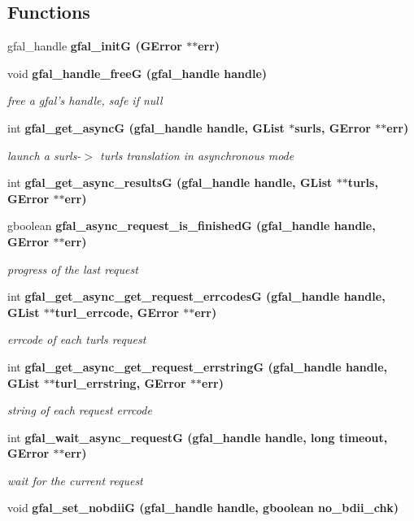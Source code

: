 \subsection*{Functions}
\begin{CompactItemize}
\item 
gfal\_\-handle \bf{gfal\_\-init\-G} (GError $\ast$$\ast$err)
\item 
void \bf{gfal\_\-handle\_\-free\-G} (gfal\_\-handle handle)\label{gfal__common__srm_8h_9dbd943eaed291897d852fc3ae560058}

\begin{CompactList}\small\item\em free a gfal's handle, safe if null \item\end{CompactList}\item 
int \bf{gfal\_\-get\_\-async\-G} (gfal\_\-handle handle, GList $\ast$surls, GError $\ast$$\ast$err)
\begin{CompactList}\small\item\em launch a surls-$>$ turls translation in asynchronous mode \item\end{CompactList}\item 
int \bf{gfal\_\-get\_\-async\_\-results\-G} (gfal\_\-handle handle, GList $\ast$$\ast$turls, GError $\ast$$\ast$err)
\item 
gboolean \bf{gfal\_\-async\_\-request\_\-is\_\-finished\-G} (gfal\_\-handle handle, GError $\ast$$\ast$err)
\begin{CompactList}\small\item\em progress of the last request \item\end{CompactList}\item 
int \bf{gfal\_\-get\_\-async\_\-get\_\-request\_\-errcodes\-G} (gfal\_\-handle handle, GList $\ast$$\ast$turl\_\-errcode, GError $\ast$$\ast$err)
\begin{CompactList}\small\item\em errcode of each turls request \item\end{CompactList}\item 
int \bf{gfal\_\-get\_\-async\_\-get\_\-request\_\-errstring\-G} (gfal\_\-handle handle, GList $\ast$$\ast$turl\_\-errstring, GError $\ast$$\ast$err)
\begin{CompactList}\small\item\em string of each request errcode \item\end{CompactList}\item 
int \bf{gfal\_\-wait\_\-async\_\-request\-G} (gfal\_\-handle handle, long timeout, GError $\ast$$\ast$err)
\begin{CompactList}\small\item\em wait for the current request \item\end{CompactList}\item 
void \bf{gfal\_\-set\_\-nobdii\-G} (gfal\_\-handle handle, gboolean no\_\-bdii\_\-chk)
\end{CompactItemize}


